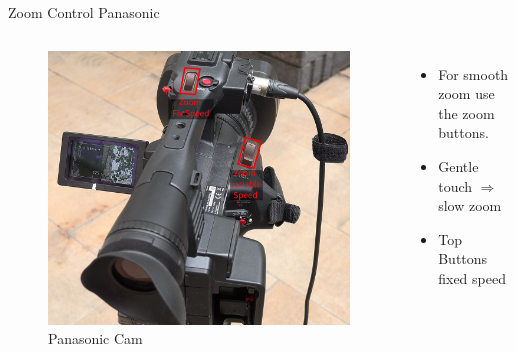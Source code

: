 \documentclass[aspectratio=169]{beamer}
\begin{document}
\begin{frame}{Zoom Control Panasonic}
	\begin{columns}[T,onlytextwidth]
	\begin{figure} 
		\centering
		\includegraphics[width=0.99\textwidth]{images/panasonic_zoom.png}
		\caption{Panasonic Cam}
	\end{figure}
		\begin{itemize}
			\item For smooth zoom use the zoom buttons.
			\item Gentle touch $\Rightarrow$ slow zoom
			\item Top Buttons fixed speed
		\end{itemize}
	\end{columns}
\end{frame}
\end{document}
